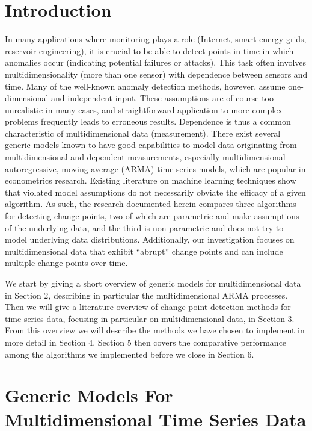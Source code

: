 \documentclass[conference,letterpaper]{IEEEtran}
\begin{document}
\section{Introduction}

In many applications where monitoring plays a role (Internet, smart energy grids, reservoir engineering), it is crucial to be able to detect points in time in which anomalies occur (indicating potential failures or attacks). 
This task often involves multidimensionality (more than one sensor) with dependence between sensors and time.
Many of the well-known anomaly detection methods, however, assume one-dimensional and independent input. 
These assumptions are of course too unrealistic in many cases, and straightforward application to more complex problems frequently leads to erroneous results. 
Dependence is thus a common characteristic of multidimensional data (measurement). 
There exist several generic models known to have good capabilities to model data originating from multidimensional and dependent measurements, especially multidimensional autoregressive, moving average (ARMA) time series models, which are popular in econometrics research.
Existing literature on machine learning techniques show that violated model assumptions do not necessarily obviate the efficacy of a given algorithm.
As such, the research documented herein compares three algorithms for detecting change points, two of which are parametric and make assumptions of the underlying data, and the third is non-parametric and does not try to model underlying data distributions.
Additionally, our investigation focuses on multidimensional data that exhibit ``abrupt'' change points and can include multiple change points over time.

We start by giving a short overview of generic models for multidimensional data in Section 2, describing in particular the multidimensional ARMA processes. 
Then we will give a literature overview of change point detection methods for time series data, focusing in particular on multidimensional data, in Section 3. 
From this overview we will describe the methods we have chosen to implement in more detail in Section 4. 
Section 5 then covers the comparative performance among the algorithms we implemented before we close in Section 6.

\section{Generic Models For Multidimensional Time Series Data}
\end{document}
